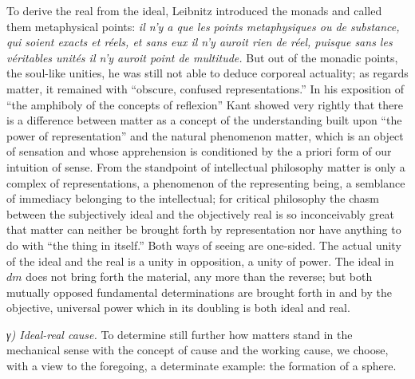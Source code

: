 \documentclass[12pt,a4paper]{book}
\newcommand{\subrunin}[1]{\emph{#1}\hspace{0.4em}}
\begin{document}
To derive the real from the ideal, Leibnitz introduced the monads and called them metaphysical
points:
\textit{il n'y a que les points metaphysiques ou de substance, qui soient exacts et réels, et
sans eux il n'y auroit rien de réel, puisque sans les véritables unités il n'y auroit point de
multitude.} But out of the monadic points, the soul-like unities, he was
still not able to deduce corporeal actuality; as regards matter, it remained with ``obscure,
confused representations.'' In his exposition of ``the amphiboly of the concepts of reflexion''
Kant showed very rightly that there is a difference between matter as a concept of the
understanding built upon ``the power of representation'' and the natural phenomenon matter,
which is an object of sensation and whose apprehension is conditioned by the a priori form of
our intuition of sense. From the standpoint of intellectual philosophy matter is only a complex
of representations, a phenomenon of the representing being, a semblance of immediacy belonging
to the intellectual; for critical philosophy the chasm between the subjectively ideal and the
objectively real is so inconceivably great that matter can neither be brought forth by
representation nor have anything to do with ``the thing in itself.'' Both ways of seeing are
one-sided. The actual unity of the ideal and the real is a unity in opposition, a unity of
power. The ideal in $dm$ does not bring forth the material, any more than the reverse; but both
mutually opposed fundamental determinations are brought forth in and by the objective, universal
power which in its doubling is both ideal and real.

\subrunin{γ) Ideal-real cause.} To determine still further how matters stand in the mechanical
sense with the concept of cause and the working cause, we choose, with a view to the foregoing,
a determinate example: the formation of a sphere.
\end{document}
